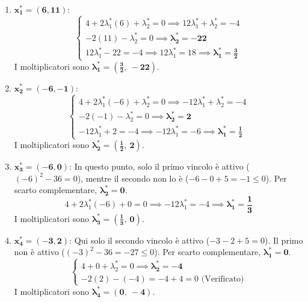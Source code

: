 \documentclass[12pt, a4paper]{article}
\begin{document}
	\begin{enumerate}
		\item $\mathbf{x^*_1 = (6, 11)}$: 
		\[
		\begin{cases}
			4 + 2\lambda^*_1(6) + \lambda^*_2 = 0 \implies 12\lambda^*_1 + \lambda^*_2 = -4 \\
			-2(11) - \lambda^*_2 = 0 \implies \mathbf{\lambda^*_2 = -22} \\
			12\lambda^*_1 - 22 = -4 \implies 12\lambda^*_1 = 18 \implies \mathbf{\lambda^*_1 = \frac{3}{2}}
		\end{cases}
		\]
		I moltiplicatori sono $\mathbf{\lambda^*_1 = \left( \frac{3}{2}, \ -22 \right)}$.
		
		\item $\mathbf{x^*_2 = (-6, -1)}$: 
		\[
		\begin{cases}
			4 + 2\lambda^*_1(-6) + \lambda^*_2 = 0 \implies -12\lambda^*_1 + \lambda^*_2 = -4 \\
			-2(-1) - \lambda^*_2 = 0 \implies \mathbf{\lambda^*_2 = 2} \\
			-12\lambda^*_1 + 2 = -4 \implies -12\lambda^*_1 = -6 \implies \mathbf{\lambda^*_1 = \frac{1}{2}}
		\end{cases}
		\]
		I moltiplicatori sono $\mathbf{\lambda^*_2 = \left( \frac{1}{2}, \ 2 \right)}$.
		
		\item $\mathbf{x^*_3 = (-6, 0)}$:
		In questo punto, solo il primo vincolo è attivo ($(-6)^2 - 36 = 0$), mentre il secondo non lo è ($-6 - 0 + 5 = -1 \le 0$). Per scarto complementare, $\mathbf{\lambda^*_2 = 0}$.
		\[
		4 + 2\lambda^*_1(-6) + 0 = 0 \implies -12\lambda^*_1 = -4 \implies \mathbf{\lambda^*_1 = \frac{1}{3}}
		\]
		I moltiplicatori sono $\mathbf{\lambda^*_3 = \left( \frac{1}{3}, \ 0 \right)}$.
		
		\item $\mathbf{x^*_4 = (-3, 2)}$:
		Qui solo il secondo vincolo è attivo ($-3 - 2 + 5 = 0$). Il primo non è attivo ($(-3)^2 - 36 = -27 \le 0$). Per scarto complementare, $\mathbf{\lambda^*_1 = 0}$.
		\[
		\begin{cases}
			4 + 0 + \lambda^*_2 = 0 \implies \mathbf{\lambda^*_2 = -4} \\
			-2(2) - (-4) = -4 + 4 = 0 \text{ (Verificato)}
		\end{cases}
		\]
		I moltiplicatori sono $\mathbf{\lambda^*_4 = (0, \ -4)}$.
	\end{enumerate}
	
\end{document}
